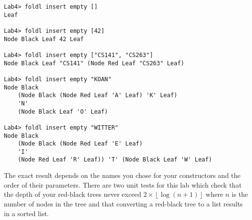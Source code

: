 \begin{verbatim}
Lab4> foldl insert empty []
Leaf

Lab4> foldl insert empty [42]
Node Black Leaf 42 Leaf

Lab4> foldl insert empty ["CS141", "CS263"]
Node Black Leaf "CS141" (Node Red Leaf "CS263" Leaf)

Lab4> foldl insert empty "KOAN"
Node Black 
    (Node Black (Node Red Leaf 'A' Leaf) 'K' Leaf) 
    'N' 
    (Node Black Leaf 'O' Leaf)

Lab4> foldl insert empty "WITTER"
Node Black 
    (Node Black (Node Red Leaf 'E' Leaf) 
    'I' 
    (Node Red Leaf 'R' Leaf)) 'T' (Node Black Leaf 'W' Leaf)
\end{verbatim}

The exact result depends on the names you chose for your constructors and the order of their parameters. There are two unit tests for this lab which check that the depth of your red-black trees never exceed $2 \times \left \lfloor{\log(n+1)}\right \rfloor$ where $n$ is the number of nodes in the tree and that converting a red-black tree to a list results in a sorted list.


\taskLine
